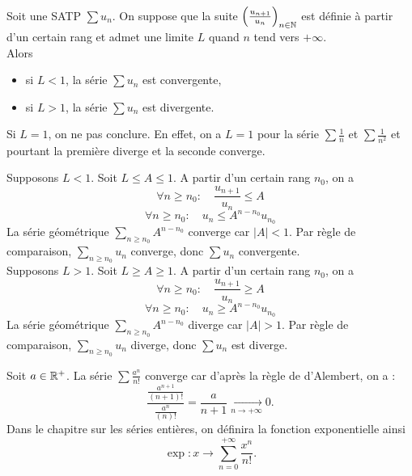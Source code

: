 \documentclass{book}
\begin{document}
\begin{Proposition}
Soit une SATP $\sum u_n$.  On suppose que la suite $\left(\frac{u_{n+1}}{u_n}\right)_{n\in\mathbb{N}}$  est définie à partir d'un certain rang et admet une limite $L$  quand  $n$ tend vers $+\infty$.\\
Alors
\begin{itemize}
\item si $L<1$, la série $\sum u_n$ est convergente,
\item si $L>1$, la série $\sum u_n$ est divergente.
\end{itemize}
\end{Proposition}
\begin{Remarque}
Si $L=1$, on ne pas conclure. En effet, on a $L=1$ pour la série $\sum \frac{1}{n}$ et $\sum \frac{1}{n^2}$ et pourtant la première diverge et la seconde converge.   
\end{Remarque}

\begin{Demonstration}
Supposons   $L<1$. Soit $L\leq A\leq 1$.  A partir d'un certain rang $n_0$,  on a 
$$\forall  n\geq n_0 :\quad \frac{u_{n+1}}{u_n}\leq A$$
$$\forall  n\geq n_0 :\quad u_n \leq A^{n-n_0}u_{n_0}$$ 
La série géométrique $\sum_{n\geq n_0}  A^{n-n_0}$ converge car $|A|<1$. Par règle de comparaison, $\sum_{n\geq n_0}  u_n$ converge, donc $\sum  u_n$  convergente.\\
Supposons   $L>1$. Soit $L\geq A \geq 1$.  A partir d'un certain rang $n_0$,  on a 
$$\forall  n\geq n_0 :\quad \frac{u_{n+1}}{u_n}\geq A$$
$$\forall  n\geq n_0 :\quad u_n \geq A^{n-n_0}u_{n_0}$$ 
La série géométrique $\sum_{n\geq n_0}  A^{n-n_0}$  diverge car $|A|>1$. Par règle de comparaison, $\sum_{n\geq n_0}  u_n$ diverge, donc $\sum  u_n$ est diverge.
\end{Demonstration}
\begin{Exemple}
Soit $a\in \mathbb{R}^+$. La série $\sum \frac{a^n}{n!}$ converge car d'après la règle de d'Alembert, on a :
$$\frac{ \frac{a^{n+1}}{(n+1)!}}{\frac{a^{n}}{(n)!}}=\frac{a}{n+1}\xrightarrow[n \to +\infty]{}0.$$
Dans le chapitre sur les séries entières, on définira la fonction exponentielle ainsi  $$\exp:x\to \sum_{n=0}^{+\infty} \frac{x^n}{n!}.$$
\end{Exemple}



%
%
%
\end{document}
